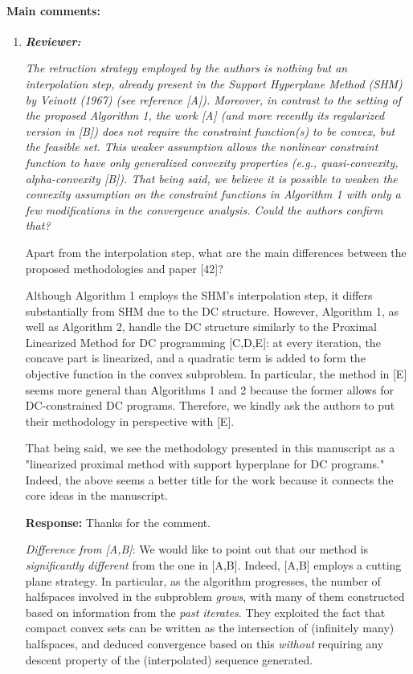 \documentclass{article}
\begin{document}
\paragraph{Main comments:}
\begin{enumerate}
   \item \textit{\textbf{Reviewer:}} {\it The retraction strategy employed by the authors is nothing but an interpolation step, already present in the Support Hyperplane Method (SHM) by Veinott (1967) (see reference [A]). Moreover, in contrast to the setting of the proposed Algorithm 1, the work [A] (and more recently its regularized version in [B]) does not require the constraint function(s) to be convex, but the feasible set. This weaker assumption allows the nonlinear constraint function to have only generalized convexity properties (e.g., quasi-convexity, alpha-convexity [B]). That being said, we believe it is possible to weaken the convexity assumption on the constraint functions in Algorithm 1 with only a few modifications in the convergence analysis. Could the authors confirm that?
       
       Apart from the interpolation step, what are the main differences between the proposed methodologies and paper [42]?
       
Although Algorithm 1 employs the SHM's interpolation step, it differs substantially from SHM due to the DC structure. However, Algorithm 1, as well as Algorithm 2, handle the DC structure similarly to the Proximal Linearized Method for DC programming [C,D,E]: at every iteration, the concave part is linearized, and a quadratic term is added to form the objective function in the convex subproblem. In particular, the method in [E] seems more general than Algorithms 1 and 2 because the former allows for DC-constrained DC programs. Therefore, we kindly ask the authors to put their methodology in perspective with [E].

That being said, we see the methodology presented in this manuscript as a "linearized proximal method with support hyperplane for DC programs."
Indeed, the above seems a better title for the work because it connects the core ideas in the manuscript.}

    \textbf{Response:} Thanks for the comment. 
    
    {\it Difference from [A,B]}: We would like to point out that our method is {\it significantly different} from the one in [A,B]. Indeed, [A,B] employs a cutting plane strategy. In particular, as the algorithm progresses, the number of halfspaces involved in the subproblem {\em grows}, with many of them constructed based on information from the \emph{past iterates}. They exploited the fact that compact convex sets can be written as the intersection of (infinitely many) halfspaces, and deduced convergence based on this {\em without} requiring any descent property of the (interpolated) sequence generated.
    

\end{enumerate}
\end{document}
